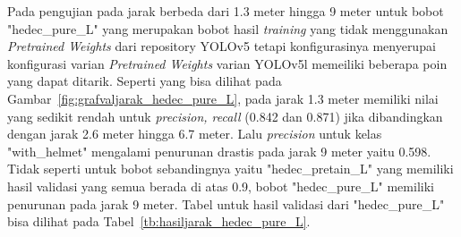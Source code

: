 \begin{enumerate}
  \par Pada pengujian pada jarak berbeda dari 1.3 meter hingga 9 meter untuk bobot "hedec\_pure\_L" yang merupakan bobot hasil \emph{training}
  yang tidak menggunakan \emph{Pretrained Weights} dari repository YOLOv5 tetapi konfigurasinya menyerupai konfigurasi
  varian \emph{Pretrained Weights} varian YOLOv5l memeiliki beberapa poin yang dapat ditarik. 
  Seperti yang bisa dilihat pada Gambar~\ref{fig:grafvaljarak_hedec_pure_L},
  pada jarak 1.3 meter memiliki nilai yang sedikit rendah untuk \emph{precision, recall} (0.842 dan 0.871) jika dibandingkan dengan jarak 2.6 meter hingga 6.7 meter. 
  Lalu \emph{precision} untuk kelas "with\_helmet" mengalami penurunan drastis pada jarak 9 meter yaitu 0.598.
  Tidak seperti untuk bobot sebandingnya yaitu "hedec\_pretain\_L" yang memiliki hasil validasi yang semua berada di atas 0.9, bobot "hedec\_pure\_L" memiliki penurunan
  pada jarak 9 meter.
  Tabel untuk hasil validasi dari "hedec\_pure\_L" bisa dilihat
  pada Tabel~\ref{tb:hasiljarak_hedec_pure_L}.
  

\end{enumerate}
